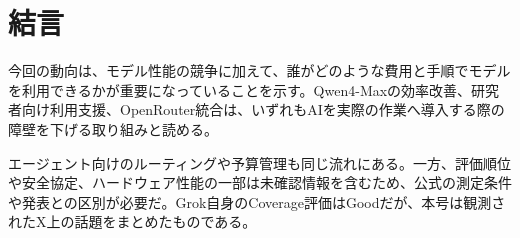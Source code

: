 \section{結言}
今回の動向は、モデル性能の競争に加えて、誰がどのような費用と手順でモデルを利用できるかが重要になっていることを示す。Qwen4-Maxの効率改善、研究者向け利用支援、OpenRouter統合は、いずれもAIを実際の作業へ導入する際の障壁を下げる取り組みと読める。

エージェント向けのルーティングや予算管理も同じ流れにある。一方、評価順位や安全協定、ハードウェア性能の一部は未確認情報を含むため、公式の測定条件や発表との区別が必要だ。Grok自身のCoverage評価はGoodだが、本号は観測されたX上の話題をまとめたものである。